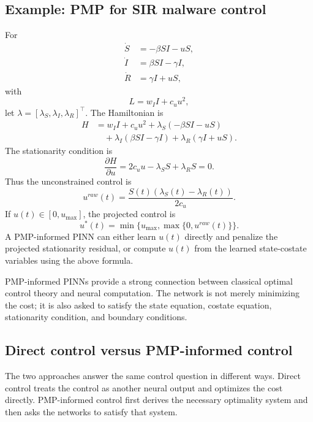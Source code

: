 \documentclass[11pt,a4paper]{article}
\begin{document}
\subsection{Example: PMP for SIR malware control}
For
\begin{align}
    \dot{S}&=-\beta SI-uS,\\
    \dot{I}&=\beta SI-\gamma I,\\
    \dot{R}&=\gamma I+uS,
\end{align}
with
\begin{equation}
    L=w_I I+c_u u^2,
\end{equation}
let $\lambda=[\lambda_S,\lambda_I,\lambda_R]^\top$. The Hamiltonian is
\begin{align}
H &= w_I I+c_u u^2 + \lambda_S(-\beta SI-uS) \\
&\quad + \lambda_I(\beta SI-\gamma I)+\lambda_R(\gamma I+uS).
\end{align}
The stationarity condition is
\begin{equation}
    \frac{\partial H}{\partial u}=2c_u u -\lambda_S S+\lambda_R S=0.
\end{equation}
Thus the unconstrained control is
\begin{equation}
    u^{raw}(t)=\frac{S(t)(\lambda_S(t)-\lambda_R(t))}{2c_u}.
\end{equation}
If $u(t)\in[0,u_{\max}]$, the projected control is
\begin{equation}
    u^*(t)=\min\{u_{\max},\max\{0,u^{raw}(t)\}\}.
\end{equation}
A PMP-informed PINN can either learn $u(t)$ directly and penalize the projected stationarity residual, or compute $u(t)$ from the learned state-costate variables using the above formula.

\begin{takeaway}
PMP-informed PINNs provide a strong connection between classical optimal control theory and neural computation. The network is not merely minimizing the cost; it is also asked to satisfy the state equation, costate equation, stationarity condition, and boundary conditions.
\end{takeaway}

\subsection{Direct control versus PMP-informed control}
The two approaches answer the same control question in different ways. Direct control treats the control as another neural output and optimizes the cost directly. PMP-informed control first derives the necessary optimality system and then asks the networks to satisfy that system.
\end{document}
